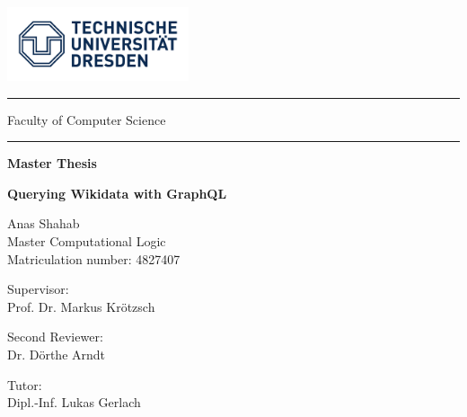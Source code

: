 \begin{titlepage}

	\begin{doublespace}

 
			\includegraphics[width=0.4\textwidth]{images/logo.jpg}

			\hrule
			\vspace*{0.15cm}
			{\Large Faculty of Computer Science}
			\vspace*{0.15cm}
			\hrule

		\begin{center}
        		\vspace{1cm}      
        
       		{\LARGE \textbf{Master Thesis} }
            
        		\vspace{0.25cm}
        
        		{\Large \textbf{Querying Wikidata with GraphQL} 
			}
            
        		\vspace{1.5cm}
        \end{center}
        
        
			Anas Shahab \\
    			Master Computational Logic \\
    			Matriculation number: 4827407
    		
    			\vspace{0.5cm}
    		
    			Supervisor: \\
	    		Prof. Dr. Markus Kr{\"o}tzsch
    			
    			\vspace{0.25cm}
    		
    			Second Reviewer: \\
			Dr. D{\"o}rthe Arndt
    			
    			\vspace{0.25cm}
    		
    			
    			Tutor: \\
    			Dipl.-Inf. Lukas Gerlach
    		

\end{doublespace}
\end{titlepage}
